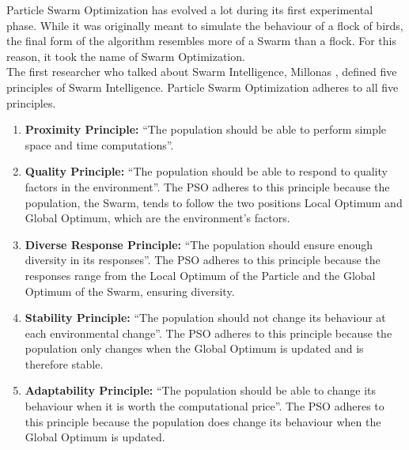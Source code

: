 Particle Swarm Optimization has evolved a lot during its first experimental phase.
While it was originally meant to simulate the behaviour of a flock of birds, the final form of the algorithm resembles more of a Swarm than a flock. For this reason, it took the name of Swarm Optimization.
\\[0.3cm]The first researcher who talked about Swarm Intelligence, Millonas \cite{SwarmIntelligence}, defined five principles of Swarm Intelligence.
Particle Swarm Optimization adheres to all five principles.
\begin{enumerate}[itemsep=0.1cm]
    \item \textbf{Proximity Principle:} “The population should be able to perform simple space and time computations”.
	\item \textbf{Quality Principle:} “The population should be able to respond to quality factors in the environment”.
	The PSO adheres to this principle because the population, the Swarm, tends to follow the two positions Local Optimum and Global Optimum, which are the environment's factors.
	\item \textbf{Diverse Response Principle:} “The population should ensure enough diversity in its responses”.
	The PSO adheres to this principle because the responses range from the Local Optimum of the Particle and the Global Optimum of the Swarm, ensuring diversity.
	\item \textbf{Stability Principle:} “The population should not change its behaviour at each environmental change”.
	The PSO adheres to this principle because the population only changes when the Global Optimum is updated and is therefore stable.
	\item \textbf{Adaptability Principle:} “The population should be able to change its behaviour when it is worth the computational price”.
	The PSO adheres to this principle because the population does change its behaviour when the Global Optimum is updated.
\end{enumerate}
% 
% 
% 
